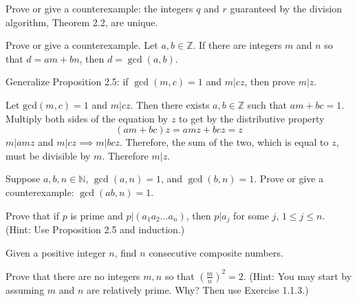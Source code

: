   \begin{exercise}[Shifrin 1.2.5]
    Prove or give a counterexample: the integers $q$ and $r$ guaranteed by the division algorithm, Theorem 2.2, are unique.
  \end{exercise}

  \begin{exercise}[Shifrin 1.2.6]
     Prove or give a counterexample. Let $a, b \in \mathbb{Z}$. If there are integers $m$ and $n$ so that $d = am + bn$, then $d = \gcd(a, b)$.
  \end{exercise}

  \begin{exercise}[Shifrin 1.2.7]
    Generalize Proposition 2.5: if $\gcd(m, c) = 1$ and $m|cz$, then prove $m|z$.
  \end{exercise}
  \begin{solution}
    Let $\mathrm{gcd}(m, c) = 1$ and $m | cz$. Then there exists $a, b \in \mathbb{Z}$ such that $am + bc = 1$. Multiply both sides of the equation by $z$ to get by the distributive property 
    \begin{equation}
      (am + bc) z = amz + bcz = z
    \end{equation} 
    $m | amz$ and $m | cz \implies m | bcz$. Therefore, the sum of the two, which is equal to $z$, must be divisible by $m$. Therefore $m | z$. 
  \end{solution}

  \begin{exercise}[Shifrin 1.2.8]
    Suppose $a, b, n \in \mathbb{N}$, $\gcd(a, n) = 1$, and $\gcd(b, n) = 1$. Prove or give a counterexample: $\gcd(ab, n) = 1$.
  \end{exercise}

  \begin{exercise}[Shifrin 1.2.9]
    Prove that if $p$ is prime and $p|(a_1 a_2 \ldots a_n)$, then $p|a_j$ for some $j$, $1 \leq j \leq n$. (Hint: Use Proposition 2.5 and induction.)
  \end{exercise}

  \begin{exercise}[Shifrin 1.2.10]
    Given a positive integer $n$, find $n$ consecutive composite numbers.
  \end{exercise}

  \begin{exercise}[Shifrin 1.2.11]
    Prove that there are no integers $m, n$ so that $(\frac{m}{n})^2 = 2$. (Hint: You may start by assuming $m$ and $n$ are relatively prime. Why? Then use Exercise 1.1.3.)
  \end{exercise}

